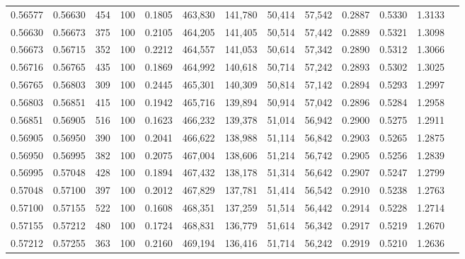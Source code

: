\begin{tabular}{rrrrrrrrrrrrr}
0.56577 & 0.56630 &   454 & 100 &                                     0.1805 & 463,830 & 141,780 &  50,414 &  57,542 & 0.2887 & 0.5330 & 1.3133 \\
0.56630 & 0.56673 &   375 & 100 &                                     0.2105 & 464,205 & 141,405 &  50,514 &  57,442 & 0.2889 & 0.5321 & 1.3098 \\
0.56673 & 0.56715 &   352 & 100 &                                     0.2212 & 464,557 & 141,053 &  50,614 &  57,342 & 0.2890 & 0.5312 & 1.3066 \\
0.56716 & 0.56765 &   435 & 100 &                                     0.1869 & 464,992 & 140,618 &  50,714 &  57,242 & 0.2893 & 0.5302 & 1.3025 \\
0.56765 & 0.56803 &   309 & 100 &                                     0.2445 & 465,301 & 140,309 &  50,814 &  57,142 & 0.2894 & 0.5293 & 1.2997 \\
0.56803 & 0.56851 &   415 & 100 &                                     0.1942 & 465,716 & 139,894 &  50,914 &  57,042 & 0.2896 & 0.5284 & 1.2958 \\
0.56851 & 0.56905 &   516 & 100 &                                     0.1623 & 466,232 & 139,378 &  51,014 &  56,942 & 0.2900 & 0.5275 & 1.2911 \\
0.56905 & 0.56950 &   390 & 100 &                                     0.2041 & 466,622 & 138,988 &  51,114 &  56,842 & 0.2903 & 0.5265 & 1.2875 \\
0.56950 & 0.56995 &   382 & 100 &                                     0.2075 & 467,004 & 138,606 &  51,214 &  56,742 & 0.2905 & 0.5256 & 1.2839 \\
0.56995 & 0.57048 &   428 & 100 &                                     0.1894 & 467,432 & 138,178 &  51,314 &  56,642 & 0.2907 & 0.5247 & 1.2799 \\
0.57048 & 0.57100 &   397 & 100 &                                     0.2012 & 467,829 & 137,781 &  51,414 &  56,542 & 0.2910 & 0.5238 & 1.2763 \\
0.57100 & 0.57155 &   522 & 100 &                                     0.1608 & 468,351 & 137,259 &  51,514 &  56,442 & 0.2914 & 0.5228 & 1.2714 \\
0.57155 & 0.57212 &   480 & 100 &                                     0.1724 & 468,831 & 136,779 &  51,614 &  56,342 & 0.2917 & 0.5219 & 1.2670 \\
0.57212 & 0.57255 &   363 & 100 &                                     0.2160 & 469,194 & 136,416 &  51,714 &  56,242 & 0.2919 & 0.5210 & 1.2636 \\

\end{tabular}
